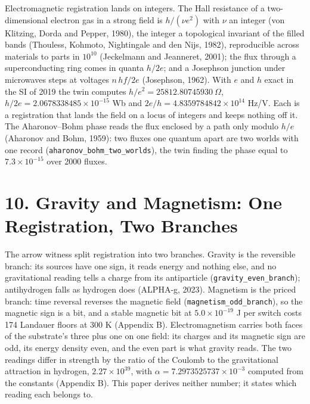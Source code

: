 \documentclass[10pt]{article}
\begin{document}
Electromagnetic registration lands on integers. The Hall resistance of a
two-dimensional electron gas in a strong field is \(h/(\nu e^2)\) with
\(\nu\) an integer (von Klitzing, Dorda and Pepper, 1980), the integer a
topological invariant of the filled bands (Thouless, Kohmoto,
Nightingale and den Nijs, 1982), reproducible across materials to parts
in \(10^{10}\) (Jeckelmann and Jeanneret, 2001); the flux through a
superconducting ring comes in quanta \(h/2e\); and a Josephson junction
under microwaves steps at voltages \(n\,hf/2e\) (Josephson, 1962). With
\(e\) and \(h\) exact in the SI of 2019 the twin computes
\(h/e^2=25812.80745930\ \Omega\), \(h/2e=2.0678338485\times10^{-15}\) Wb
and \(2e/h=4.8359784842\times10^{14}\) Hz/V. Each is a registration that
lands the field on a locus of integers and keeps nothing off it. The
Aharonov--Bohm phase reads the flux enclosed by a path only modulo
\(h/e\) (Aharonov and Bohm, 1959): two fluxes one quantum apart are two
worlds with one record (\texttt{aharonov\_bohm\_two\_worlds}), the twin
finding the phase equal to \(7.3\times10^{-15}\) over 2000 fluxes.

\hypertarget{gravity-and-magnetism-one-registration-two-branches}{%
\section{10. Gravity and Magnetism: One Registration, Two
Branches}\label{gravity-and-magnetism-one-registration-two-branches}}

The arrow witness split registration into two branches. Gravity is the
reversible branch: its sources have one sign, it reads energy and
nothing else, and no gravitational reading tells a charge from its
antiparticle (\texttt{gravity\_even\_branch}); antihydrogen falls as
hydrogen does (ALPHA-g, 2023). Magnetism is the priced branch: time
reversal reverses the magnetic field (\texttt{magnetism\_odd\_branch}),
so the magnetic sign is a bit, and a stable magnetic bit at
\(5.0\times10^{-19}\) J per switch costs 174 Landauer floors at 300 K
(Appendix B). Electromagnetism carries both faces of the substrate's
three plus one on one field: its charges and its magnetic sign are odd,
its energy density even, and the even part is what gravity reads. The
two readings differ in strength by the ratio of the Coulomb to the
gravitational attraction in hydrogen, \(2.27\times10^{39}\), with
\(\alpha=7.2973525737\times10^{-3}\) computed from the constants
(Appendix B). This paper derives neither number; it states which reading
each belongs to.
\end{document}
